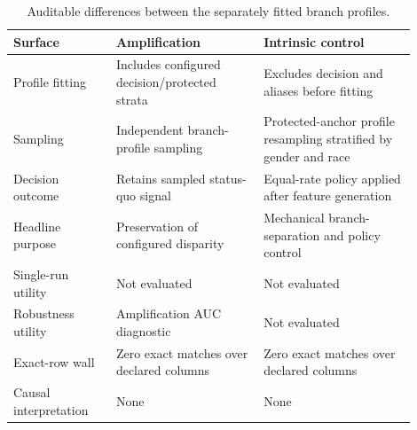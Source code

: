 \begin{table}[htbp]
\centering
\footnotesize
\AccessibleTableHeaderRow
\begin{tabular}{@{}>{\RaggedRight\arraybackslash}p{0.23\linewidth}
                    >{\RaggedRight\arraybackslash}p{0.33\linewidth}
                    >{\RaggedRight\arraybackslash}p{0.34\linewidth}@{}}
\toprule
Surface & Amplification & Intrinsic control \\
\midrule
Profile fitting & Includes configured decision/protected strata & Excludes decision and aliases before fitting \\
Sampling & Independent branch-profile sampling & Protected-anchor profile resampling stratified by gender and race \\
Decision outcome & Retains sampled status-quo signal & Equal-rate policy applied after feature generation \\
Headline purpose & Preservation of configured disparity & Mechanical branch-separation and policy control \\
Single-run utility & Not evaluated & Not evaluated \\
Robustness utility & Amplification AUC diagnostic & Not evaluated \\
Exact-row wall & Zero exact matches over declared columns & Zero exact matches over declared columns \\
Causal interpretation & None & None \\
\bottomrule
\end{tabular}
\caption{Auditable differences between the separately fitted branch profiles.}
\label{tab:branch-register}
\end{table}
